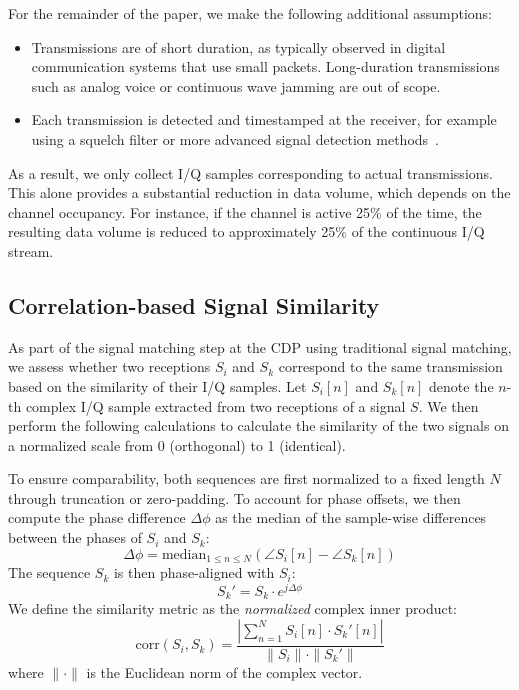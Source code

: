 \documentclass[sigconf, 10pt, nonacm, anonymous]{acmart}  %
\begin{document}
For the remainder of the paper, we make the following additional assumptions:
\begin{itemize}
    \item Transmissions are of short duration, as typically observed in digital communication systems that use small packets. Long-duration transmissions such as analog voice or continuous wave jamming are out of scope.
    \item Each transmission is detected and timestamped at the receiver, for example using a squelch filter or more advanced signal detection methods~\cite{TODO}.
\end{itemize}
As a result, we only collect I/Q samples corresponding to actual transmissions. This alone provides a substantial reduction in data volume, which depends on the channel occupancy. For instance, if the channel is active 25\% of the time, the resulting data volume is reduced to approximately 25\% of the continuous I/Q stream.

\subsection{Correlation-based Signal Similarity}
\label{sec:similarity}

As part of the signal matching step at the CDP using traditional signal matching, we assess whether two receptions $S_i$ and $S_k$ correspond to the same transmission based on the similarity of their I/Q samples. Let $S_i[n]$ and $S_k[n]$ denote the $n$-th complex I/Q sample extracted from two receptions of a signal $S$. We then perform the following calculations to calculate the similarity of the two signals on a normalized scale from 0 (orthogonal) to 1 (identical).

To ensure comparability, both sequences are first normalized to a fixed length $N$ through truncation or zero-padding. To account for phase offsets, we then compute the phase difference $\Delta \phi$ as the median of the sample-wise differences between the phases of $S_i$ and $S_k$:
$$\Delta \phi = \text{median}_{1 \le n \le N}(\angle S_i[n] - \angle S_k[n])$$
The sequence $S_k$ is then phase-aligned with $S_i$:
$$S_k' = S_k \cdot e^{j \Delta \phi}$$
We define the similarity metric as the \emph{normalized} complex inner product:
\begin{equation}
\text{corr}(S_i, S_k) = \frac{\left|\sum_{n=1}^{N} S_i[n] \cdot S_k'[n]\right|}{\|S_i\| \cdot \|S_k'\|}
\label{eqn:iq_similarity}
\end{equation}
where $\|{\cdot}\|$ is the Euclidean norm of the complex vector.
\end{document}

